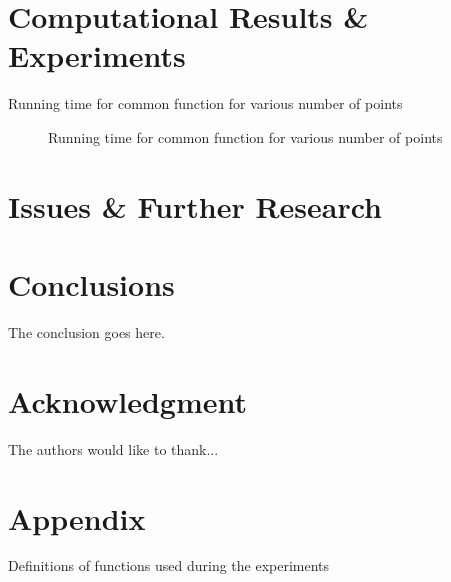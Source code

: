 \documentclass[12pt]{article}
\begin{document}
\section{Computational Results \& Experiments}
\label{sec:experiments}

\begin{table}[H]
\centering

\caption{Running time for common function for various number of points}
\label{table:kysymys}
\end{table}



\begin{figure}
  \caption{Running time for common function for various number of points}
  \label{fig:key}
\end{figure}

\section{Issues \& Further Research}
\label{sec:issues}

\section{Conclusions}
\label{sec:conclusion}

The conclusion goes here.

\section*{Acknowledgment}
The authors would like to thank...

\section*{Appendix}



\begin{table}[H]
\centering

\caption{Definitions of functions used during the experiments}
\label{table:functions_definitions}
\end{table}




\end{document}
